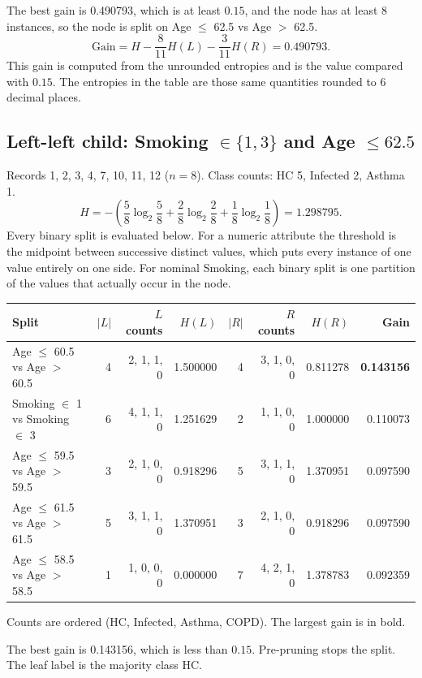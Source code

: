 The best gain is 0.490793, which is at least $0.15$, and the node has at least 8 instances, so the node is split on Age $\le$ 62.5 vs Age $>$ 62.5.
\[ \mathrm{Gain} = H - \frac{8}{11}H(L) - \frac{3}{11}H(R) = 0.490793. \]
This gain is computed from the unrounded entropies and is the value compared with $0.15$. The entropies in the table are those same quantities rounded to 6 decimal places.

\subsection*{Left-left child: Smoking $\in \{1,3\}$ and Age $\le 62.5$}

Records 1, 2, 3, 4, 7, 10, 11, 12 ($n=8$). Class counts: HC 5, Infected 2, Asthma 1.
\[ H = -\left(\frac{5}{8}\log_2\frac{5}{8}+\frac{2}{8}\log_2\frac{2}{8}+\frac{1}{8}\log_2\frac{1}{8}\right) = 1.298795. \]
Every binary split is evaluated below. For a numeric attribute the threshold is the midpoint between successive distinct values, which puts every instance of one value entirely on one side. For nominal Smoking, each binary split is one partition of the values that actually occur in the node.

\begin{center}
\scriptsize
\begin{tabular}{lrrrrrrr}
\toprule
Split & $|L|$ & $L$ counts & $H(L)$ & $|R|$ & $R$ counts & $H(R)$ & Gain \\
\midrule
Age $\le$ 60.5 vs Age $>$ 60.5 & 4 & 2, 1, 1, 0 & 1.500000 & 4 & 3, 1, 0, 0 & 0.811278 & \textbf{0.143156} \\
Smoking $\in$ {1} vs Smoking $\in$ {3} & 6 & 4, 1, 1, 0 & 1.251629 & 2 & 1, 1, 0, 0 & 1.000000 & 0.110073 \\
Age $\le$ 59.5 vs Age $>$ 59.5 & 3 & 2, 1, 0, 0 & 0.918296 & 5 & 3, 1, 1, 0 & 1.370951 & 0.097590 \\
Age $\le$ 61.5 vs Age $>$ 61.5 & 5 & 3, 1, 1, 0 & 1.370951 & 3 & 2, 1, 0, 0 & 0.918296 & 0.097590 \\
Age $\le$ 58.5 vs Age $>$ 58.5 & 1 & 1, 0, 0, 0 & 0.000000 & 7 & 4, 2, 1, 0 & 1.378783 & 0.092359 \\
\bottomrule
\end{tabular}
\end{center}
Counts are ordered (HC, Infected, Asthma, COPD). The largest gain is in bold.

The best gain is 0.143156, which is less than $0.15$. Pre-pruning stops the split. The leaf label is the majority class HC.

